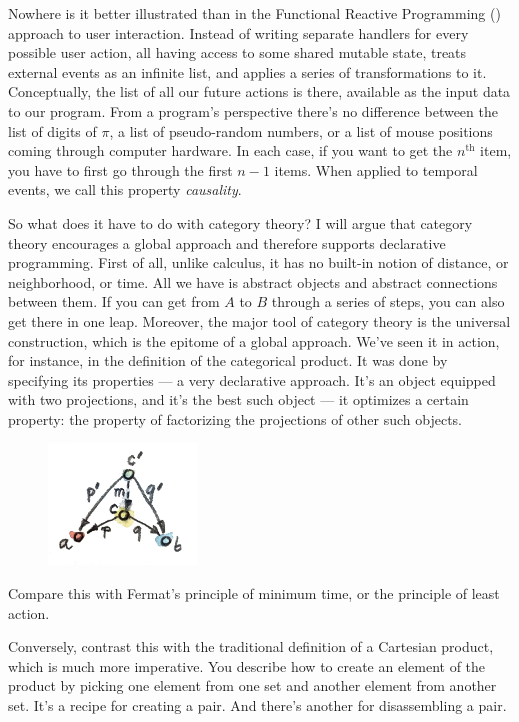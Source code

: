 Nowhere is it better illustrated than in the Functional Reactive
Programming () approach to user interaction. Instead of writing separate
handlers for every possible user action, all having access to some
shared mutable state,  treats external events as an infinite list,
and applies a series of transformations to it. Conceptually, the list of
all our future actions is there, available as the input data to our
program. From a program's perspective there's no difference between the
list of digits of $\pi$, a list of pseudo-random numbers, or a list of mouse
positions coming through computer hardware. In each case, if you want to
get the $n^\text{th}$ item, you have to first go through the first $n-1$ items. When
applied to temporal events, we call this property \emph{causality}.

So what does it have to do with category theory? I will argue that
category theory encourages a global approach and therefore supports
declarative programming. First of all, unlike calculus, it has no
built-in notion of distance, or neighborhood, or time. All we have is
abstract objects and abstract connections between them. If you can get
from $A$ to $B$ through a series of steps, you can also get there in one
leap. Moreover, the major tool of category theory is the universal
construction, which is the epitome of a global approach. We've seen it
in action, for instance, in the definition of the categorical product.
It was done by specifying its properties --- a very declarative
approach. It's an object equipped with two projections, and it's the
best such object --- it optimizes a certain property: the property of
factorizing the projections of other such objects.

\begin{figure}[H]
\centering
\includegraphics[width=1.56250in]{images/productranking.jpg}
\end{figure}

Compare this with Fermat's principle of minimum time, or the principle
of least action.

Conversely, contrast this with the traditional definition of a Cartesian
product, which is much more imperative. You describe how to create an
element of the product by picking one element from one set and another
element from another set. It's a recipe for creating a pair. And there's
another for disassembling a pair.

